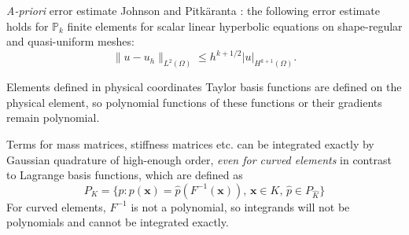 \documentclass[11pt]{beamer}
\let\bld\boldsymbol
\begin{document}
\begin{frame}{\emph{A-priori} error estimate}
Johnson and Pitk\"aranta \cite{johnson_pitkaranta}: the following error estimate holds for $\mathbb{P}_k$ finite elements for scalar linear hyperbolic equations on shape-regular and quasi-uniform meshes:
\begin{equation}
\lVert u-u_h \rVert_{L^2(\Omega)} \leq h^{k+1/2} |u|_{H^{k+1}(\Omega)}.
\end{equation}
\end{frame}

\begin{frame}{Elements defined in physical coordinates}
Taylor basis functions are defined on the physical element, so polynomial functions of these functions or their gradients remain polynomial. 

Terms for mass matrices, stiffness matrices etc. can be integrated exactly by Gaussian quadrature of high-enough order, \emph{even for curved elements} in contrast to Lagrange basis functions, which are defined as \cite{claesjohnson}
\begin{equation}
P_K = \{ p: p(\bld{x}) = \hat{p}(F^{-1}(\bld{x})),\, \bld{x} \in K,\, \hat{p} \in P_{\hat{K}} \}
\end{equation}
For curved elements, $F^{-1}$ is not a polynomial, so integrands will not be polynomials and cannot be integrated exactly.
\end{frame}
\end{document}

